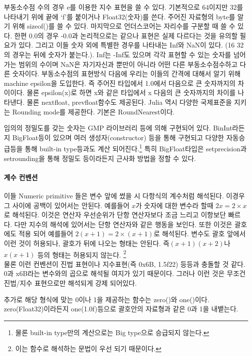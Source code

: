 \documentclass[a4paper, 11pt]{report}
\theoremstyle{definition}
\begin{document}
부동소수점 수의 경우 e를 이용한 지수 표현을 쓸 수 있다. 기본적으로 64이지만 32를 나타내기 위에 끝에 `f'를 붙이거나 Float32(숫자)를 쓴다.
주어진 자료형의 byte를 알기 위해 sizeof()를 쓸 수 있다. 마지막으로 언더스코어는 자리수를 구분할 때 쓸 수 있다. 한편 0.0의 경우 -0.0과
논리적으로는 같으나 표현은 실제 다르다는 것을 유의할 필요가 있다. 그리고 이들 숫자 외에 특별한 경우를 나타내는 Inf와 NaN이 있다.
(16 32의 경우는 뒤에 숫자가 붙는다.). Inf는 -Inf도 있으며 각각 표현할 수 있는 숫자를 넘어 가는 범위의 수이며 NaN은 자기자신과 뿐만이 아니라
어떤 다른 부동소수점수하고 다른 숫자이다.
부동소수점의 표현방식 다음에 우리는 이들의 간격에 대해서 알기 위해 machine epsilon을 도입한다. 즉 주어진 타입에서 1.0에서 다음으로 큰 숫자까지의 차이이다.
물론 epsilon(x)로 하면 x와 같은 타입에서 x 다음의 큰 숫자까지의 차이를 나타낸다. 물론 nextfloat, prevfloat함수도 제공된다.
Julia 역시 다양한 국제표준을 지키는 Rounding mode를 제공한다. 기본은 RoundNearest이다.

임의의 정밀도를 갖는 숫자는 GMP 라이브러리 등에 의해 구현되어 있다. BinInt라든지 BigFloat등이 있으며 여러 생성자(constructor) 등을 통해
구현되고 다양한 자동승급등을 통해 built-in type등과도 계산 되어진다.\footnote{물론 built-in type만의 계산으로는 Big type으로 승급되지 않는다.}
특히 BigFloat타입은 setprecision과 setrounding을 통해 정밀도 등이라든지 근사화 방법을 정할 수 있다.

\paragraph{계수 컨벤션}
이들 Numeric primitive 들은 변수 앞에 썼을 시 다항식의 계수처럼 해석된다. 이경우 그 사이에 공백이 있어서는 안된다. 예를들어 
$x$가 숫자에 대한 변수라 할때 $2x = 2\times x$로 해석된다. 이것은 연산자 우선순위가 단항 연산자보다 조금 느리고 이항보단 빠르다.
다만 지수의 해석에 있어서는 단항 연산자와 같은 행동을 보인다. 또한 이것은 괄호에도 적용 되어 
예를들어 $2(x+1) = 2 \times (x+1)$로 해석된다.
변수도 괄호 앞에서 이런 것이 허용되나, 괄호가 뒤에 나오는 형태는 안된다. 즉$(x+1)(x+2)$나 $x(x+1)$ 등의 형태는 허용되지 않는다.
\footnote{이는 함수로 해석하는 문법이 우선 되기 때문이다.} \\
물론 이런 컨벤션이 진법 표현이나 지수표현(즉 0x6B, 1.5f22) 등등과 충돌할 것 같다. 0과 x6B라는 변수와의 곱으로 해석될 여지가 있기 때문이다. 
그러나 이런 것은 무조건 진법/지수 표현으로만 해석되게 강제 되어있다.

추가로 해당 형식에 맞는 0이나 1을 제공하는 함수는 zero()와 one()이다. zero(Float32)이라든지 one(1.0f)등으로 괄호안의 자료형과 같은
0과 1을 내뱉는다.
\end{document}
